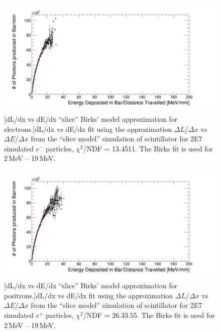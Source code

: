 \begin{figure}[htbp]
 \centering
 \includegraphics[width=\linewidth]{Appendix4/Figs/newNewDldxVsDeDx/electronDeDxDlDx.png}
 [dL/dx vs dE/dx ``slice'' Birks' model approximation for electrons.]{dL/dx vs dE/dx fit using the approximation $\Delta L$/$\Delta x$ vs $\Delta E$/$\Delta x$ from the ``slice model'' simulation of scintillator for 2E7 simulated $e^-$ particles, $\chi^2$/NDF = 13.4511. The Birks fit is used for 2\,MeV -- 19\,MeV. } 
 \label{fig:slice_Electron_dl_dx}
\end{figure}

\begin{figure}[htbp]
 \centering
 \includegraphics[width=\linewidth]{Appendix4/Figs/newNewDldxVsDeDx/positronDeDxDlDx.png}
 [dL/dx vs dE/dx ``slice'' Birks' model approximation for positrons.]{dL/dx vs dE/dx fit using the approximation $\Delta L$/$\Delta x$ vs $\Delta E$/$\Delta x$ from the ``slice model'' simulation of scintillator for 2E7 simulated $e^+$ particles, $\chi^2$/NDF = 26.33.55. The Birks fit is used for 2\,MeV -- 19\,MeV. } 
 \label{fig:slice_Positron_dl_dx}
\end{figure}

